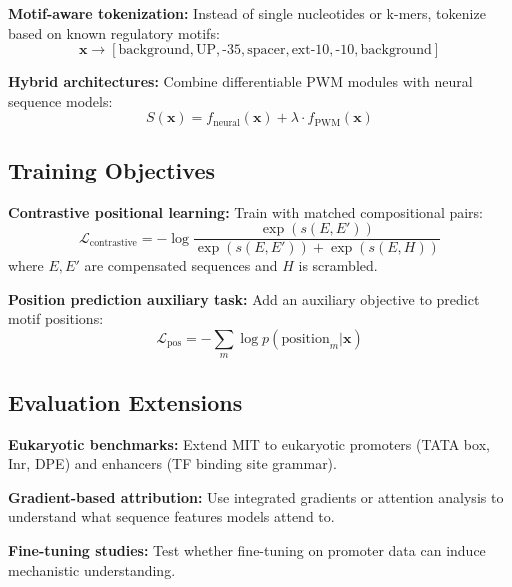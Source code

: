 \documentclass{article}
\begin{document}
\textbf{Motif-aware tokenization:} Instead of single nucleotides or k-mers, tokenize based on known regulatory motifs:
\begin{equation}
\mathbf{x} \rightarrow [\text{background}, \text{UP}, \text{-35}, \text{spacer}, \text{ext-10}, \text{-10}, \text{background}]
\end{equation}

\textbf{Hybrid architectures:} Combine differentiable PWM modules with neural sequence models:
\begin{equation}
S(\mathbf{x}) = f_{\text{neural}}(\mathbf{x}) + \lambda \cdot f_{\text{PWM}}(\mathbf{x})
\end{equation}

\subsection{Training Objectives}

\textbf{Contrastive positional learning:} Train with matched compositional pairs:
\begin{equation}
\mathcal{L}_{\text{contrastive}} = -\log \frac{\exp(s(E, E'))}{\exp(s(E, E')) + \exp(s(E, H))}
\end{equation}
where $E, E'$ are compensated sequences and $H$ is scrambled.

\textbf{Position prediction auxiliary task:} Add an auxiliary objective to predict motif positions:
\begin{equation}
\mathcal{L}_{\text{pos}} = -\sum_m \log p(\text{position}_m | \mathbf{x})
\end{equation}

\subsection{Evaluation Extensions}

\textbf{Eukaryotic benchmarks:} Extend MIT to eukaryotic promoters (TATA box, Inr, DPE) and enhancers (TF binding site grammar).

\textbf{Gradient-based attribution:} Use integrated gradients or attention analysis to understand what sequence features models attend to.

\textbf{Fine-tuning studies:} Test whether fine-tuning on promoter data can induce mechanistic understanding.
\end{document}
